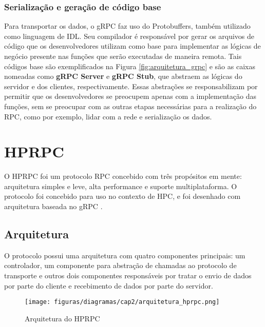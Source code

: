 \subsubsection{Serialização e geração de código base}

Para transportar os dados, o gRPC faz uso do Protobuffers, também utilizado como linguagem de IDL. Seu compilador é responsável por gerar os arquivos de código que os desenvolvedores utilizam como base para implementar as lógicas de negócio presente nas funções que serão executadas de maneira remota. Tais códigos base são exemplificados na Figura \ref{fig:arquitetura_grpc} e são as caixas nomeadas como \textbf{gRPC Server} e \textbf{gRPC Stub}, que abstraem as lógicas do servidor e dos clientes, respectivamente. Essas abstrações se responsabilizam por permitir que os desenvolvedores se preocupem apenas com a implementação das funções, sem se preocupar com as outras etapas necessárias para a realização do RPC, como por exemplo, lidar com a rede e serialização os dados.

\section{HPRPC}

O HPRPC foi um protocolo RPC concebido com três propósitos em mente: arquitetura simples e leve, alta performance e suporte multiplataforma. O protocolo foi concebido para uso no contexto de HPC, e foi desenhado com arquitetura baseada no gRPC \cite{bagci_lightweight_2016}.

\subsection{Arquitetura}

O protocolo possui uma arquitetura com quatro componentes principais: um controlador, um componente para abstração de chamadas ao protocolo de transporte e outros dois componentes responsáveis por tratar o envio de dados por parte do cliente e recebimento de dados por parte do servidor. 

\begin{figure}[ht]
    \centering
    \caption{Arquitetura do HPRPC}
    \texttt{[image: figuras/diagramas/cap2/arquitetura\_hprpc.png]} 
    \label{fig:arquitetura_hprpc}
\end{figure}

